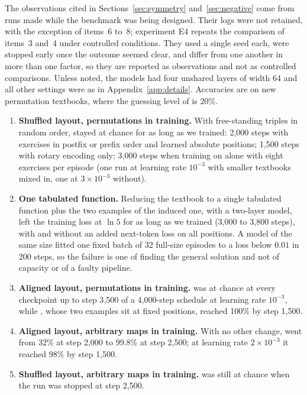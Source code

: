 The observations cited in Sections~\ref{sec:symmetry} and~\ref{sec:negative} come from runs made while the benchmark was being designed.
Their logs were not retained, with the exception of items~6 to~8; experiment E4 repeats the comparison of items~3 and~4 under controlled conditions.
They used a single seed each, were stopped early once the outcome seemed clear, and differ from one another in more than one factor, so they are reported as observations and not as controlled comparisons.
Unless noted, the models had four unshared layers of width 64 and all other settings were as in Appendix~\ref{app:details}.
Accuracies are on new permutation textbooks, where the guessing level of  is 20\%.

\begin{enumerate}
\item \textbf{Shuffled layout, permutations in training.}
With free-standing  triples in random order,  stayed at chance for as long as we trained: 2{,}000 steps with exercises in postfix or prefix order and learned absolute positions; 1{,}500 steps with rotary encoding only; 3{,}000 steps when training on  alone with eight exercises per episode (one run at learning rate $10^{-3}$ with smaller textbooks mixed in, one at $3\times10^{-3}$ without).
\item \textbf{One tabulated function.}
Reducing the textbook to a single tabulated function plus the two examples of the induced one, with a two-layer model, left the training loss at $\ln 5$ for as long as we trained (3{,}000 to 3{,}800 steps), with and without an added next-token loss on all positions.
A model of the same size fitted one fixed batch of 32 full-size episodes to a loss below $0.01$ in 200 steps, so the failure is one of finding the general solution and not of capacity or of a faulty pipeline.
\item \textbf{Aligned layout, permutations in training.}
 was at chance at every checkpoint up to step 3{,}500 of a 4{,}000-step schedule at learning rate $10^{-3}$, while , whose two examples sit at fixed positions, reached 100\% by step 1{,}500.
\item \textbf{Aligned layout, arbitrary maps in training.}
With no other change,  went from 32\% at step 2{,}000 to 99.8\% at step 2{,}500; at learning rate $2\times10^{-3}$ it reached 98\% by step 1{,}500.
\item \textbf{Shuffled layout, arbitrary maps in training.}
 was still at chance when the run was stopped at step 2{,}500.

\end{enumerate}
